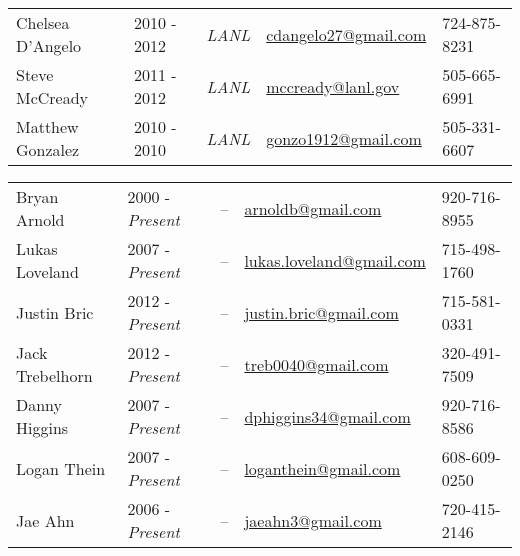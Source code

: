 \begin{center}
\begin{minipage}{\textwidth}
\begin{tabular}{p{3.2cm}p{2.2cm}p{2.7cm}p{5.0cm}p{2.4cm}}
{Chelsea D'Angelo}\label{chelsea_dangelo} & {2010 - 2012} & {\textit{LANL}}& \href{mailto:cdangelo27@gmail.com}{cdangelo27@gmail.com} & 724-875-8231\\ %

{Steve McCready} \label{steve_mccready}& {2011 - 2012} &{\textit{LANL}} & \href{mailto:mccready@lanl.gov}{mccready@lanl.gov} & 505-665-6991\\ %

{Matthew Gonzalez}\label{matt_gonzo} & {2010 -  2010} & {\textit{LANL}} & \href{mailto:gonzo1912@gmail.com}{gonzo1912@gmail.com} & 505-331-6607\\ %

\end{tabular}
\end{minipage}
\end{center}

\begin{center}
\begin{minipage}{\textwidth}
\begin{tabular}{p{3.2cm}p{2.2cm}p{2.7cm}p{5.0cm}p{2.4cm}}

Bryan Arnold & {2000 - \emph{Present}} & -- &  \href{mailto:arnoldb@gmail.com}{arnoldb@gmail.com} &   920-716-8955\\ %

Lukas Loveland & 2007 - \emph{Present} & -- &  \href{mailto:lukas.loveland@gmail.com}{lukas.loveland@gmail.com} &   715-498-1760\\ %

Justin Bric & 2012 - \emph{Present}& -- & \href{mailto:justin.bric@gmail.com}{justin.bric@gmail.com} &  715-581-0331 \\ %
	
Jack Trebelhorn & 2012 - \emph{Present} & -- & \href{mailto:treb0040@gmail.com}{treb0040@gmail.com} &   320-491-7509 \\ %

Danny Higgins & 2007 - \emph{Present} & -- & \href{mailto:dphiggins34@gmail.com}{dphiggins34@gmail.com} & 920-716-8586 \\ %

Logan Thein & 2007 - \emph{Present} & -- & \href{mailto:loganthein@gmail.com}{loganthein@gmail.com}  &   608-609-0250  \\ %

Jae Ahn & 2006 - \emph{Present} & -- & \href{mailto:jaeahn3@gmail.com}{jaeahn3@gmail.com} &   720-415-2146\\ %

\end{tabular}
\end{minipage}
\end{center}

